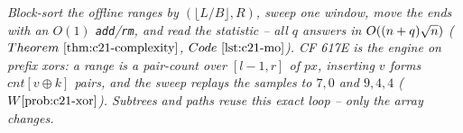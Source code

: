 \begin{recallbox}
\emph{Block-sort the offline ranges by \((\lfloor L/B\rfloor,R)\), sweep one window,
move the ends with an \(O(1)\) \texttt{add}/\texttt{rm}, and read the statistic -- all
\(q\) answers in \(O((n+q)\sqrt n)\) (\(\thmref{c21-complexity}\),
\(\coderef{c21-mo}\)).  CF 617E is the engine on prefix xors: a range is a pair-count
over \([l-1,r]\) of \(px\), inserting \(v\) forms \(cnt[v\oplus k]\) pairs, and the
sweep replays the samples to \(7,0\) and \(9,4,4\) (\(\probref{c21-xor}\)).  Subtrees
and paths reuse this \emph{exact} loop -- only the array changes.}
\end{recallbox}
